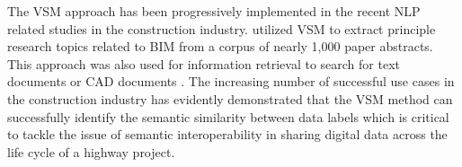 \documentclass[Journal, BackFigs,NoLists, DoubleSpace]{ascelike}%
\begin{document}
\par
The VSM approach has been progressively implemented in the recent NLP related studies in the construction industry.  utilized VSM to extract principle research topics related to BIM from a corpus of nearly 1,000 paper abstracts. This approach was also used for information retrieval to search for text documents \cite{lv15} or CAD documents \cite{hsu13}. The increasing number of successful use cases in the construction industry has evidently demonstrated that the VSM method can successfully identify the semantic similarity between data labels which is critical to tackle the issue of semantic interoperability in sharing digital data across the life cycle of a highway project.
%
\end{document}
